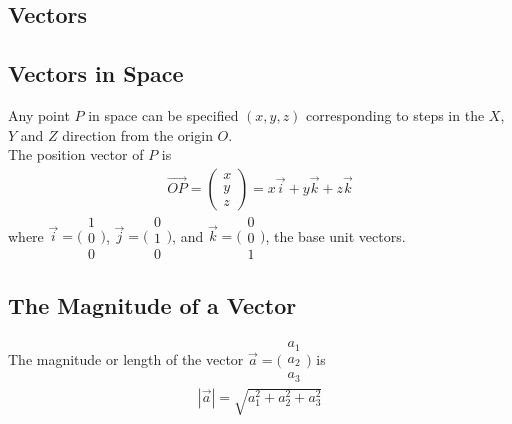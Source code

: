 \documentclass[10pt, a4paper, titlepage]{article}
\begin{document}
\begin{multicols*}{3}
\hrulefill
\section{Vectors}
\subsection{Vectors in Space}
Any point $P$ in space can be specified $(x,y,z)$ corresponding to steps in the $X$, $Y$ and $Z$ direction from the origin $O$.\\
The position vector of $P$ is
\begin{align}
	\overrightarrow{OP}=\begin{pmatrix}x\\ y \\z\end{pmatrix}=x\vec{i}+y\vec{k}+z\vec{k}
\end{align}
where $\vec{i}=\big(\begin{smallmatrix}1 \\0 \\0 \end{smallmatrix}\big)$, 
$\vec{j}=\big(\begin{smallmatrix}0 \\1 \\0 \end{smallmatrix}\big)$, and 
$\vec{k}=\big(\begin{smallmatrix}0 \\0 \\1 \end{smallmatrix}\big)$, the base unit vectors.

\dotfill
\subsection{The Magnitude of a Vector}
The magnitude or length of the vector $\vec{a}=\big(\begin{smallmatrix}a_1 \\a_2 \\a_3 \end{smallmatrix}\big)$ is
\begin{align}
	|\vec{a}|=\sqrt{a_1^2+a_2^2+a_3^2}
\end{align}
\dotfill

\end{multicols*}
\end{document}

